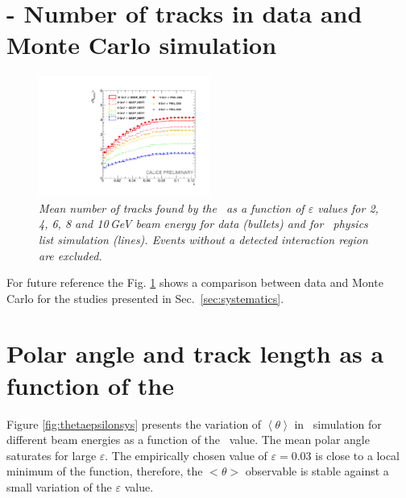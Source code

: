 \begin{appendices}
	
	\section{\ep - Number of tracks in data and Monte Carlo simulation}\label{app:a}
	
	\begin{figure}[H]
		\centering
		\includegraphics[width=0.5\textwidth]{ECAL/plots/combination.pdf}
		\caption{\label{fig:epsilonsysdata} \sl Mean number of tracks found by the \tfa\ as a function of $\varepsilon$ values for 2, 4, 6, 8 and 10\,GeV beam energy for data (bullets) and for \qgsp\ physics list simulation (lines). Events without a detected interaction region are excluded.}
	\end{figure}
	
	For future reference the Fig. \ref{fig:epsilonsysdata} shows a comparison between data and Monte Carlo for the studies presented in Sec.~\ref{sec:systematics}. 
	
	\section{Polar angle and track length as a function of the \ep}\label{app:b}
	
	Figure \ref{fig:thetaepsilonsys} presents the variation of $\left<\theta\right>$ in \qgsp\ simulation  for different beam energies as a function of the \ep\ value. 
	The mean polar angle saturates for large $\varepsilon$. The empirically chosen value of $\varepsilon=0.03$ is close to a local minimum of the function, therefore, the $<\theta>$ observable is stable against a small variation of the $\varepsilon$ value. 
	

\end{appendices}

